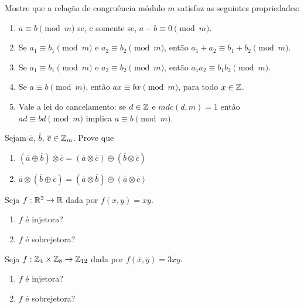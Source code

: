 \documentclass[12pt]{exam}
\begin{document}
\questao{} Mostre que a rela{\c c}{\~a}o de congru{\^e}ncia m{\'o}dulo $m$ satisfaz as seguintes propriedades:
\begin{enumerate}[label=({\alph*})]
    \item $a\equiv b\pmod{m}$ se, e somente se, $a - b\equiv 0\pmod{m}$.
    \item Se $a_{1}\equiv b_{1}\pmod{m}$ e $a_{2}\equiv b_{2}\pmod{m}$, ent{\~a}o $a_{1}+a_{2}\equiv b_{1}+b_{2}\pmod{m}$.
    \item Se $a_{1}\equiv b_{1}\pmod{m}$ e $a_{2}\equiv b_{2}\pmod{m}$, ent{\~a}o $a_{1}a_{2}\equiv b_{1}b_{2}\pmod{m}$.\label{item_provado}
    \item Se $a\equiv b\pmod{m}$, ent{\~a}o $ax\equiv bx\pmod{m}$, para todo $x \in \mathbb{Z}$.
    \item Vale a lei do cancelamento: se $d \in \mathbb{Z}$ e $mdc(d,m) = 1$ ent{\~a}o $ad \equiv bd \pmod{m}$ implica $a\equiv b \pmod{m}$.
\end{enumerate}

\vspace{.3cm}

\questao{} Sejam $\overline{a}$, $\overline{b}$, $\overline{c} \in \mathbb{Z}_m$. Prove que
\begin{enumerate}[label=({\alph*})]
    \item $(\overline{a} \oplus \overline{b}) \otimes \overline{c} = (\overline{a} \otimes \overline{c}) \oplus (\overline{b} \otimes \overline{c})$

    \item $\overline{a} \otimes (\overline{b} \oplus \overline{c}) = (\overline{a} \otimes \overline{b}) \oplus (\overline{a} \otimes \overline{c})$
\end{enumerate}

    \vspace{.3cm}

    \questao{} Seja $f: \mathbb{R}^2 \to \mathbb{R}$ dada por $f(x,y) = xy$.
    \begin{enumerate}[label={\alph*})]
        \item $f$ {\'e} injetora?

        \item $f$ {\'e} sobrejetora?
    \end{enumerate}

    \vspace{.3cm}

    \questao{} Seja $f: \mathbb{Z}_4 \times \mathbb{Z}_8 \to \mathbb{Z}_{12}$ dada por $f(\overline{x},\overline{y}) = \overline{3xy}$.
    \begin{enumerate}[label={\alph*})]
        \item $f$ {\'e} injetora?

        \item $f$ {\'e} sobrejetora?
    \end{enumerate}
\end{document}
